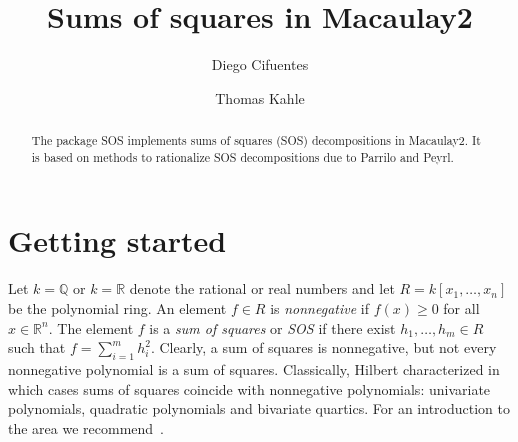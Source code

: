 \documentclass[11pt]{amsart}
\theoremstyle{plain}%
\theoremstyle{definition}
\theoremstyle{remark}
\newcommand{\SOS}{\textsc{SOS}\xspace}
\newcommand{\QQ}{\mathbb{Q}}
\newcommand{\RR}{\mathbb{R}}
\begin{document}
\title[SOS.m2]{Sums of squares in Macaulay2}

\author{Diego Cifuentes}
\address{Massachusetts Institute of Technology \\ Boston, USA}

\author{Thomas Kahle}
\address{Otto-von-Guericke University \\ Magdeburg, Germany}

\begin{abstract}
  The package \SOS implements sums of squares (SOS) decompositions in
  Macaulay2.  It is based on methods to rationalize SOS decompositions
  due to Parrilo and Peyrl.
\end{abstract}

\maketitle


\section{Getting started}

Let $k = \QQ$ or $k = \RR$ denote the rational or real numbers and let
$R = k[x_{1},\dots,x_{n}]$ be the polynomial ring.  An element
$f\in R$ is \emph{nonnegative} if $f(x) \ge 0$ for all
$x \in \RR^{n}$.  The element $f$ is a \emph{sum of squares} or
\emph{SOS} if there exist $h_{1},\dots,h_{m} \in R$ such that
$f=\sum_{i=1}^{m}h_{i}^{2}$.  Clearly, a sum of squares is
nonnegative, but not every nonnegative polynomial is a sum of squares.
Classically, Hilbert characterized in which cases sums of squares
coincide with nonnegative polynomials: univariate polynomials,
quadratic polynomials and bivariate quartics.  For an introduction to
the area we
recommend~\cite{scheiderer2009positivity,blekherman2012semidefinite}.
\end{document}
